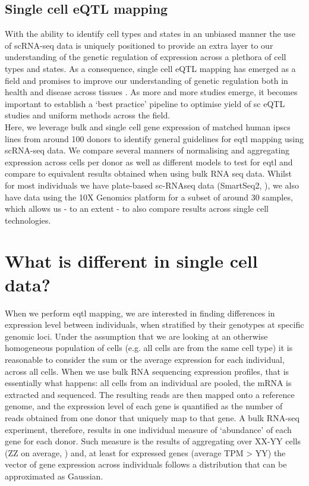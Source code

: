\subsection{Single cell eQTL mapping}

With the ability to identify cell types and states in an unbiased manner the use of scRNA-seq data is uniquely positioned to provide an extra layer to our understanding of the genetic regulation of expression across a plethora of cell types and states.
As a consequence, single cell eQTL mapping has emerged as a field and promises to improve our understanding of genetic regulation both in health and disease across tissues \cite{wills2013single, van2018single, kang2018multiplexed, sarkar2019discovery, cuomo2020single, jerber2020population, van2020single1}.
As more and more studies emerge, it becomes important to establish a `best practice' pipeline to optimise yield of sc eQTL studies and uniform methods across the field.\\

Here, we leverage bulk and single cell gene expression of matched human \gls{ipsc}s lines from around 100 donors to identify general guidelines for \gls{eqtl} mapping using scRNA-seq data.
We compare several manners of normalising and aggregating expression across cells per donor as well as different models to test for \gls{eqtl} and compare to equivalent results obtained when using bulk RNA seq data.
Whilst for most individuals we have plate-based sc-RNAseq data (SmartSeq2, \cite{picelli2013smart}), we also have data using the 10X Genomics platform \cite{zheng2017massively} for a subset of around 30 samples, which allows us - to an extent - to also compare results across single cell technologies.\\

\section{What is different in single cell data?}

When we perform \gls{eqtl} mapping, we are interested in finding differences in expression level between individuals, when stratified by their genotypes at specific genomic loci. 
Under the assumption that we are looking at an otherwise homogeneous population of cells (e.g. all cells are from the same cell type) it is reasonable to consider the sum or the average expression for each individual, across all cells.
When we use bulk RNA sequencing expression profiles, that is essentially what happens: all cells from an individual are pooled, the mRNA is extracted and sequenced. 
The resulting reads are then mapped onto a reference genome, and the expression level of each gene is quantified as the number of reads obtained from one donor that uniquely map to that gene. 
A bulk RNA-seq experiment, therefore, results in one individual measure of `abundance' of each gene for each donor. 
Such measure is the results of aggregating over XX-YY cells (ZZ on average, \cite{}) and, at least for expressed genes (average TPM > YY) the vector of gene expression across individuals follows a distribution that can be approximated as Gaussian.\\


